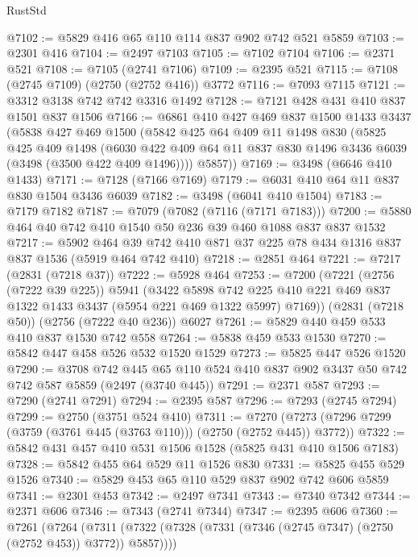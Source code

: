 \begin{lexlean}{RustStd}
\begin{coremodule}
@7102 := @5829 @416 @65 @110 @114 @837 @902 @742 @521 @5859
@7103 := @2301 @416
@7104 := @2497 @7103
@7105 := @7102 @7104
@7106 := @2371 @521
@7108 := @7105 (@2741 @7106)
@7109 := @2395 @521
@7115 := @7108 (@2745 @7109) (@2750 (@2752 @416)) @3772
@7116 := @7093 @7115
@7121 := @3312 @3138 @742 @742 @3316 @1492
@7128 := @7121 @428 @431 @410 @837 @1501 @837 @1506
@7166 := @6861
    @410
    @427
    @469
    @837
    @1500
    @1433
    @3437
    (@5838
      @427
      @469
      @1500
      (@5842
        @425
        @64
        @409
        @11
        @1498
        @830
        (@5825
          @425
          @409
          @1498
          (@6030 @422 @409 @64 @11 @837 @830 @1496 @3436 @6039 (@3498 (@3500 @422 @409 @1496))))
        @5857))
@7169 := @3498 (@6646 @410 @1433)
@7171 := @7128 (@7166 @7169)
@7179 := @6031 @410 @64 @11 @837 @830 @1504 @3436 @6039
@7182 := @3498 (@6041 @410 @1504)
@7183 := @7179 @7182
@7187 := @7079 (@7082 (@7116 (@7171 @7183)))
@7200 := @5880 @464 @40 @742 @410 @1540 @50 @236 @39 @460 @1088 @837 @837 @1532
@7217 := @5902
    @464
    @39
    @742
    @410
    @871
    @37
    @225
    @78
    @434
    @1316
    @837
    @837
    @1536
    (@5919 @464 @742 @410)
@7218 := @2851 @464
@7221 := @7217 (@2831 (@7218 @37))
@7222 := @5928 @464
@7253 := @7200
    (@7221
      (@2756 (@7222 @39 @225))
      @5941
      (@3422
        @5898
        @742
        @225
        @410
        @221
        @469
        @837
        @1322
        @1433
        @3437
        (@5954 @221 @469 @1322 @5997)
        @7169))
    (@2831 (@7218 @50))
    (@2756 (@7222 @40 @236))
    @6027
@7261 := @5829 @440 @459 @533 @410 @837 @1530 @742 @558
@7264 := @5838 @459 @533 @1530
@7270 := @5842 @447 @458 @526 @532 @1520 @1529
@7273 := @5825 @447 @526 @1520
@7290 := @3708
    @742
    @445
    @65
    @110
    @524
    @410
    @837
    @902
    @3437
    @50
    @742
    @742
    @587
    @5859
    (@2497 (@3740 @445))
@7291 := @2371 @587
@7293 := @7290 (@2741 @7291)
@7294 := @2395 @587
@7296 := @7293 (@2745 @7294)
@7299 := @2750 (@3751 @524 @410)
@7311 := @7270 (@7273 (@7296 @7299 (@3759 (@3761 @445 (@3763 @110))) (@2750 (@2752 @445)) @3772))
@7322 := @5842 @431 @457 @410 @531 @1506 @1528 (@5825 @431 @410 @1506 @7183)
@7328 := @5842 @455 @64 @529 @11 @1526 @830
@7331 := @5825 @455 @529 @1526
@7340 := @5829 @453 @65 @110 @529 @837 @902 @742 @606 @5859
@7341 := @2301 @453
@7342 := @2497 @7341
@7343 := @7340 @7342
@7344 := @2371 @606
@7346 := @7343 (@2741 @7344)
@7347 := @2395 @606
@7360 := @7261
    (@7264 (@7311 (@7322 (@7328 (@7331 (@7346 (@2745 @7347) (@2750 (@2752 @453)) @3772)) @5857))))

\end{coremodule}
\end{lexlean}
